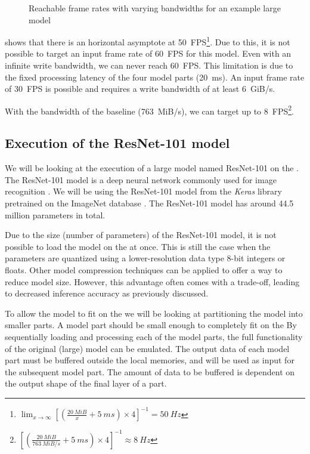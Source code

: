 \begin{figure}
    \centering
    
    \caption{Reachable frame rates with varying bandwidths for an example large model}
    \label{fig:large_model_bandwidth_analysis_example}
\end{figure}

 shows that there is an horizontal asymptote at \SI{50}{FPS}\footnote{ $\lim_{x \to \infty} \left[ \left( \frac{\SI{20}{MiB}}{x} + \SI{5}{ms} \right) \times 4 \right]^{-1} = \SI{50}{Hz}$}.
Due to this, it is not possible to target an input frame rate of \SI{60}{FPS} for this model.
Even with an infinite write bandwidth, we can never reach \SI{60}{FPS}.
This limitation is due to the fixed processing latency of the four model parts (\SI{20}{ms}).
An input frame rate of \SI{30}{FPS} is possible and requires a write bandwidth of at least \SI{6}{GiB/s}.

With the bandwidth of the baseline \confignoc{} (\SI{763}{MiB/s}), we can target up to \SI{8}{FPS}\footnote{$\left[ \left( \frac{\SI{20}{MiB}}{\SI{763}{MiB/s}} + \SI{5}{ms} \right) \times 4 \right]^{-1} \approx \SI{8}{Hz}$}.

\subsection{Execution of the ResNet-101 model}
We will be looking at the execution of a large model named ResNet-101 on the \graicore{}.
The ResNet-101 model is a deep neural network commonly used for image recognition \autocite{heDeepResidualLearning2015}.
We will be using the ResNet-101 model from the \textit{Keras} library \cite{chollet2015keras} pretrained on the ImageNet database \cite{russakovskyImageNetLargeScale2014}.
The ResNet-101 model has around 44.5 million parameters in total.

Due to the size (number of parameters) of the ResNet-101 model, it is not possible to load the model on the \graicore{} at once.
This is still the case when the parameters are quantized using a lower-resolution data type 8-bit integers or floats.
Other model compression techniques can be applied to offer a way to reduce model size.
However, this advantage often comes with a trade-off, leading to decreased inference accuracy as previously discussed.

To allow the model to fit on the \graicore{} we will be looking at partitioning the model into smaller parts.
A model part should be small enough to completely fit on the \graicore{}
By sequentially loading and processing each of the model parts, the full functionality of the original (large) model can be emulated.
The output data of each model part must be buffered outside the local memories, and will be used as input for the subsequent model part.
The amount of data to be buffered is dependent on the output shape of the final layer of a part.

